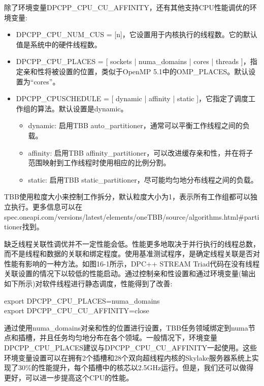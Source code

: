 除了环境变量DPCPP\_CPU\_CU\_AFFINITY，还有其他支持CPU性能调优的环境变量:\par

\begin{itemize}
	\item DPCPP\_CPU\_NUM\_CUS = [n]，它设置用于内核执行的线程数。它的默认值是系统中的硬件线程数。
	\item DPCPP\_CPU\_PLACES = [ sockets | numa\_domains | 	cores | threads ]，指定亲和性将被设置的位置，类似于OpenMP 5.1中的OMP\_PLACES。默认设置为“cores”。
	\item DPCPP\_CPUSCHEDULE = [ dynamic | affinity | static ]，它指定了调度工作组的算法。默认设置是dynamic。
	\begin{itemize}
		\item dynamic: 启用TBB auto\_partitioner，通常可以平衡工作线程之间的负载。
		\item affinity: 启用TBB affinity\_partitioner，可以改进缓存亲和性，并在将子范围映射到工作线程时使用相应的比例分割。
		\item static: 启用TBB static\_partitioner，尽可能均匀地分布线程之间的负载。
	\end{itemize}
\end{itemize}

TBB使用粒度大小来控制工作拆分，默认粒度大小为1，表示所有工作组都可以独立执行。更多信息可以在spec.oneapi.com/versions/latest/elements/oneTBB/source/algorithms.html\#partitioner找到。\par

缺乏线程关联性调优并不一定性能会低。性能更多地取决于并行执行的线程总数，而不是线程和数据的关联和绑定程度。使用基准测试程序，是确定线程关联是否对性能有影响的一种方法。如图16-1所示，DPC++ STREAM Triad代码在没有线程关联设置的情况下以较低的性能启动。通过控制亲和性设置和通过环境变量(输出如下所示)对软件线程进行静态调度，性能得到了改善:\par

\begin{tcolorbox}[colback=white,colframe=black]
export DPCPP\_CPU\_PLACES=numa\_domains\\
export DPCPP\_CPU\_CU\_AFFINITY=close
\end{tcolorbox}

通过使用numa\_domains对亲和性的位置进行设置，TBB任务领域绑定到numa节点和插槽，并且任务均匀地分布在各个领域。一般情况下，环境变量DPCPP\_CPU\_PLACES建议与DPCPP\_CPU\_CU\_AFFINITY一起使用。这些环境变量设置可以在拥有2个插槽和28个双向超线程内核的Skylake服务器系统上实现了30\%的性能提升，每个插槽中的核芯以2.5GHz运行。但是，我们还可以做得更好，可以进一步提高这个CPU的性能。\par

